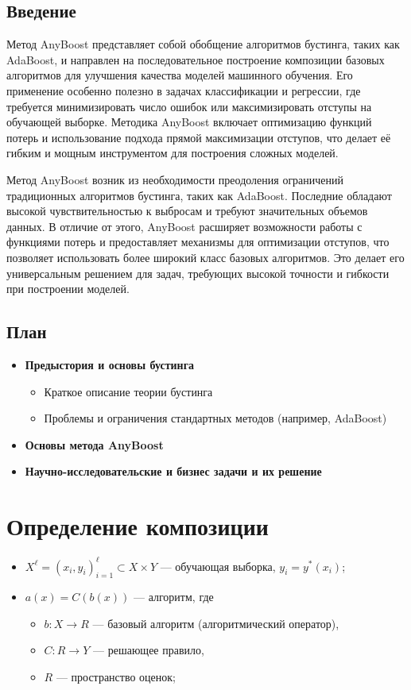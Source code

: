 \subsection*{Введение}
Метод AnyBoost представляет собой обобщение алгоритмов бустинга, таких как AdaBoost, и направлен на последовательное построение композиции базовых алгоритмов для улучшения качества моделей машинного обучения. Его применение особенно полезно в задачах классификации и регрессии, где требуется минимизировать число ошибок или максимизировать отступы на обучающей выборке. Методика AnyBoost включает оптимизацию функций потерь и использование подхода прямой максимизации отступов, что делает её гибким и мощным инструментом для построения сложных моделей.

Метод AnyBoost возник из необходимости преодоления ограничений традиционных алгоритмов бустинга, таких как AdaBoost. Последние обладают высокой чувствительностью к выбросам и требуют значительных объемов данных. В отличие от этого, AnyBoost расширяет возможности работы с функциями потерь и предоставляет механизмы для оптимизации отступов, что позволяет использовать более широкий класс базовых алгоритмов. Это делает его универсальным решением для задач, требующих высокой точности и гибкости при построении моделей.

\subsection*{План}

\begin{itemize}
    \item \textbf{Предыстория и основы бустинга}
    \begin{itemize}
        \item Краткое описание теории бустинга
        \item Проблемы и ограничения стандартных методов (например, AdaBoost)
    \end{itemize}
    \item \textbf{Основы метода AnyBoost}
    \item \textbf{Научно-исследовательские и бизнес задачи и их решение}
\end{itemize}

\section*{Определение композиции}

\begin{itemize}
    \item $X^\ell = (x_i, y_i)_{i=1}^\ell \subset X \times Y$ — обучающая выборка, $y_i = y^*(x_i)$;
    \item $a(x) = C(b(x))$ — алгоритм, где
    \begin{itemize}
        \item $b: X \rightarrow R$ — базовый алгоритм (алгоритмический оператор),
        \item $C: R \rightarrow Y$ — решающее правило,
        \item $R$ — пространство оценок;
    \end{itemize}
\end{itemize}

